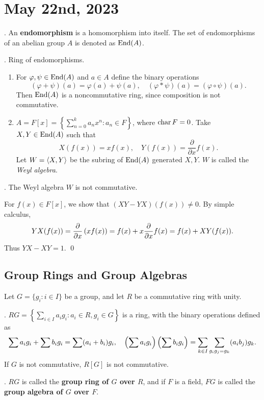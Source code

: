 \section*{May 22nd, 2023}

\setcounter{topic}{23}

.  An \textbf{endomorphism} is a homomorphism into itself. The set of endomorphisms of an abelian group \(A\) is denoted as \(\operatorname{End}(A)\).

\ex. Ring of endomorphisms.
\begin{enumerate}
    \item For \(\varphi, \psi \in \operatorname{End}(A)\) and \(a \in A\) define the binary operations
    \[
        (\varphi + \psi)(a) = \varphi(a) + \psi(a), \quad (\varphi * \psi)(a) = (\varphi \circ \psi)(a).
    \]
    Then \(\operatorname{End}(A)\) is a noncommutative ring, since composition is not commutative.
    \item \(A = F[x] = \left\{\sum_{n = 0}^k a_n x^n : a_n \in F\right\}\), where \(\operatorname{char} F = 0\). Take \(X, Y \in \operatorname{End}(A)\) such that
    \[
        X(f(x)) = xf(x), \quad Y(f(x)) = \frac{\partial}{\partial x}f(x).
    \]
    Let \(W = \left\langle X, Y \right\rangle\) be the subring of \(\operatorname{End}(A)\) generated \(X, Y\). \(W\) is called the \textit{Weyl algebra}.
\end{enumerate}

\prop. The Weyl algebra \(W\) is not commutative.

\pf For \(f(x) \in F[x]\), we show that \((XY - YX)(f(x)) \neq 0\). By simple calculus,
\[
    YX(f(x)) = \frac{\partial}{\partial x}\left( x f(x) \right) = f(x) + x \frac{\partial}{\partial x}f(x) = f(x) + XY(f(x)).
\]
Thus \(YX - XY = 1\). \qed

\subsection*{Group Rings and Group Algebras}

Let \(G = \{g_i : i \in I\}\) be a group, and let \(R\) be a commutative ring with unity.

\prop. \(RG = \left\{\sum_{i \in I} a_ig_i : a_i \in R, g_i \in G\right\}\) is a ring, with the binary operations defined as
\[
    \sum a_i g_i + \sum b_i g_i = \sum (a_i + b_i) g_i, \quad \left( \sum a_i g_i \right) \left( \sum b_i g_i \right) = \sum_{k \in I} \sum_{g_i g_j = g_k} (a_i b_j) g_k.
\]
If \(G\) is not commutative, \(R[G]\) is not commutative.

. \(RG\) is called the \textbf{group ring of \(G\) over \(R\)}, and if \(F\) is a field, \(FG\) is called the \textbf{group algebra of \(G\) over \(F\)}.

